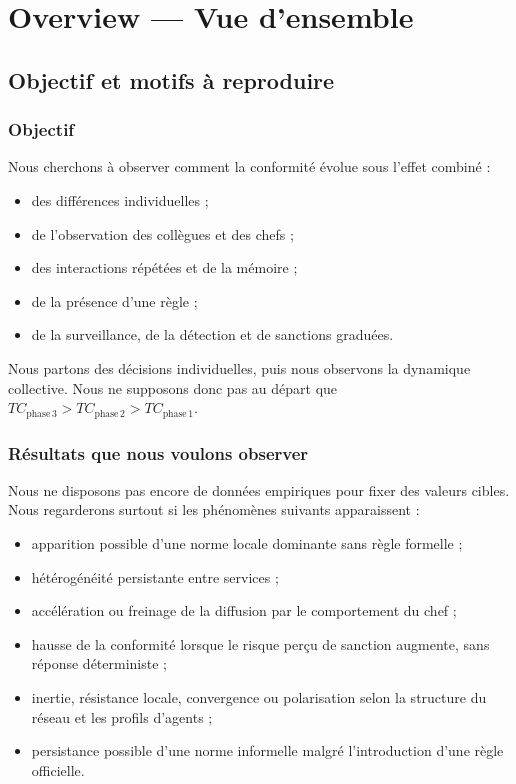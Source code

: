 \documentclass[11pt,a4paper]{article}
\begin{document}
\section{Overview — Vue d’ensemble}

\subsection{Objectif et motifs à reproduire}

\subsubsection{Objectif}

Nous cherchons à observer comment la conformité évolue sous l’effet combiné :

\begin{itemize}
  \item des différences individuelles ;
  \item de l’observation des collègues et des chefs ;
  \item des interactions répétées et de la mémoire ;
  \item de la présence d’une règle ;
  \item de la surveillance, de la détection et de sanctions graduées.
\end{itemize}

Nous partons des décisions individuelles, puis nous observons la dynamique
collective. Nous ne supposons donc pas au départ que
$TC_{\mathrm{phase\,3}}>TC_{\mathrm{phase\,2}}>TC_{\mathrm{phase\,1}}$.

\subsubsection{Résultats que nous voulons observer}

Nous ne disposons pas encore de données empiriques pour fixer des valeurs
cibles. Nous regarderons surtout si les phénomènes suivants apparaissent :

\begin{itemize}
  \item apparition possible d’une norme locale dominante sans règle formelle ;
  \item hétérogénéité persistante entre services ;
  \item accélération ou freinage de la diffusion par le comportement du chef ;
  \item hausse de la conformité lorsque le risque perçu de sanction augmente,
  sans réponse déterministe ;
  \item inertie, résistance locale, convergence ou polarisation selon la
  structure du réseau et les profils d’agents ;
  \item persistance possible d’une norme informelle malgré l’introduction d’une
  règle officielle.
\end{itemize}
\end{document}
